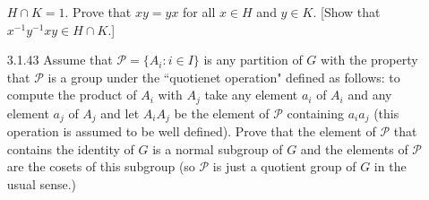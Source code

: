 \begin{enumerate}
                  $H \cap K = 1$. Prove that $xy = yx$ for all $x \in H$ and
                  $y \in K$. [Show that $x^{-1}y^{-1}xy \in H \cap K$.]
   \item[3.1.43]  Assume that $\mathcal{P} = \{A_i : i \in I\}$ is any partition
                  of $G$ with the property that $\mathcal{P}$ is a group under
                  the ``quotienet operation" defined as follows: to compute the
                  product of $A_i$ with $A_j$ take any element $a_i$ of $A_i$
                  and any element $a_j$ of $A_j$ and let $A_iA_j$ be the element
                  of $\mathcal{P}$ containing $a_ia_j$ (this operation is
                  assumed to be well defined). Prove that the element of
                  $\mathcal{P}$ that contains the identity of $G$ is a normal
                  subgroup of $G$ and the elements of $\mathcal{P}$ are the
                  cosets of this subgroup (so $\mathcal{P}$ is just a quotient
                  group of $G$ in the usual sense.)
\end{enumerate}
